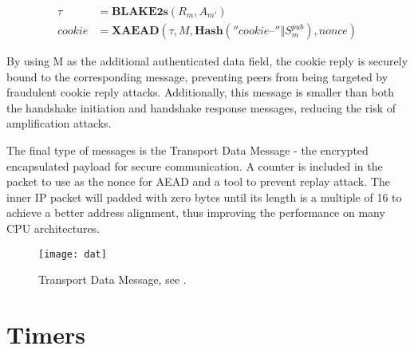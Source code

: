     \begin{align*}
      \tau &= \textbf{BLAKE2s}(R_m, A_{m'}) \\
      cookie &= \textbf{XAEAD}(\tau, M, \textbf{Hash}(''cookie\texttt{--}'' \Vert S^{pub}_m), nonce)
    \end{align*}

    By using M as the additional authenticated data field, the cookie reply is securely bound 
    to the corresponding message, preventing peers from being targeted by fraudulent cookie 
    reply attacks. Additionally, this message is smaller than both the handshake initiation and 
    handshake response messages, reducing the risk of amplification attacks.

    The final type of messages is the Transport Data Message - the encrypted encapsulated payload
    for secure communication. A counter is included in the packet to use as the nonce for AEAD
    and a tool to prevent replay attack. The inner IP packet will padded with zero bytes until
    its length is a multiple of 16 to achieve a better address alignment, thus improving the
    performance on many CPU architectures.

    \begin{figure}[h]
      \centering
      \texttt{[image: dat]}
      \caption{Transport Data Message, see \cite[p.~12]{wireguard}.}
      \label{fig:transdata}
    \end{figure} 



\section{Timers} \label{w4}